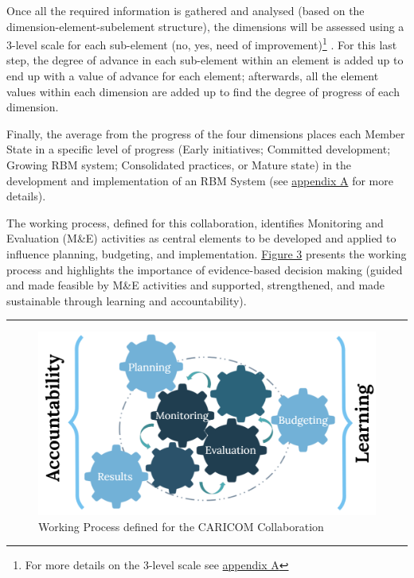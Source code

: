\documentclass[
  10pt,
]{book}
\begin{document}
Once all the required information is gathered and analysed (based on the dimension-element-subelement structure), the dimensions will be assessed using a 3-level scale for each sub-element (no, yes, need of improvement)\footnote{For more details on the 3-level scale see \protect\hyperlink{appendixA}{appendix A}} . For this last step, the degree of advance in each sub-element within an element is added up to end up with a value of advance for each element; afterwards, all the element values within each dimension are added up to find the degree of progress of each dimension.

Finally, the average from the progress of the four dimensions places each Member State in a specific level of progress (Early initiatives; Committed development; Growing RBM system; Consolidated practices, or Mature state) in the development and implementation of an RBM System (see \protect\hyperlink{appendixA}{appendix A} for more details).

The working process, defined for this collaboration, identifies Monitoring and Evaluation (M\&E) activities as central elements to be developed and applied to influence planning, budgeting, and implementation. \protect\hyperlink{fig:figure3}{Figure 3} presents the working process and highlights the importance of evidence-based decision making (guided and made feasible by M\&E activities and supported, strengthened, and made sustainable through learning and accountability).

\begin{center}\rule{0.5\linewidth}{0.5pt}\end{center}

\begin{figure}

{\centering \includegraphics[width=1\linewidth]{./images/figure_3} 

}

\caption{Working Process defined for the CARICOM Collaboration}\label{fig:figure3}
\end{figure}
\end{document}
